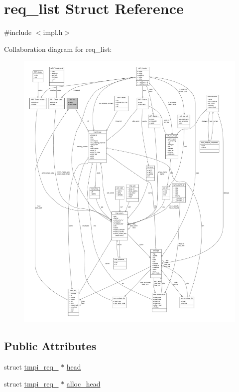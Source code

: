 \hypertarget{structreq__list}{\section{req\-\_\-list \-Struct \-Reference}
\label{structreq__list}
}


{\ttfamily \#include $<$impl.\-h$>$}



\-Collaboration diagram for req\-\_\-list\-:
\nopagebreak
\begin{figure}[H]
\begin{center}
\leavevmode
\includegraphics[width=350pt]{structreq__list__coll__graph}
\end{center}
\end{figure}
\subsection*{\-Public \-Attributes}
\begin{DoxyCompactItemize}
\item 
struct \hyperlink{structtmpi__req__}{tmpi\-\_\-req\-\_\-} $\ast$ \hyperlink{structreq__list_af1fac090221a42d718521115eea764e1}{head}
\item 
struct \hyperlink{structtmpi__req__}{tmpi\-\_\-req\-\_\-} $\ast$ \hyperlink{structreq__list_a8042936f16edb469a6382b3a988027e4}{alloc\-\_\-head}
\end{DoxyCompactItemize}


